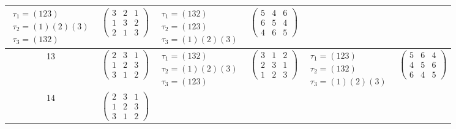\begin{longtable}{|c|p{2.7cm}|p{2.5cm}|p{2.7cm}|p{2.5cm}|p{2.7cm}|}
    $\begin{array}{l}\tau_1=(123)\\ \tau_2=(1)(2)(3)\\ \tau_3=(132)\end{array}$ &
    $\begin{pmatrix}3&2&1\\1&3&2\\2&1&3\end{pmatrix}$                           &
    $\begin{array}{l}\tau_1=(132)\\ \tau_2=(123)\\ \tau_3=(1)(2)(3)\end{array}$ &
    $\begin{pmatrix}5&4&6\\6&5&4\\4&6&5\end{pmatrix}$                                                                                                       \\
    \hline
    13                                                                          &
    $\begin{pmatrix}2&3&1\\1&2&3\\3&1&2\end{pmatrix}$                           &
    $\begin{array}{l}\tau_1=(132)\\ \tau_2=(1)(2)(3)\\ \tau_3=(123)\end{array}$ &
    $\begin{pmatrix}3&1&2\\2&3&1\\1&2&3\end{pmatrix}$                           &
    $\begin{array}{l}\tau_1=(123)\\ \tau_2=(132)\\ \tau_3=(1)(2)(3)\end{array}$ &
    $\begin{pmatrix}5&6&4\\4&5&6\\6&4&5\end{pmatrix}$                                                                                                       \\
    \hline
    14                                                                          &
    $\begin{pmatrix}2&3&1\\1&2&3\\3&1&2\end{pmatrix}$                           &

\end{longtable}
